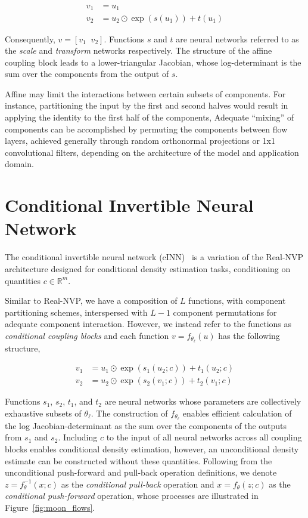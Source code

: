 \begin{align}
    v_1 &= u_1 \nonumber \\
    v_2 &= u_2 \odot \exp(s(u_1)) + t(u_1) \nonumber
\end{align}

Consequently, $v = \left[ v_1 \;\; v_2 \right]$.
Functions $s$ and $t$ are neural networks referred to as the \textit{scale} and \textit{transform} networks respectively.
The structure of the affine coupling block leads to a lower-triangular Jacobian, whose log-determinant is the
sum over the components from the output of $s$.

Affine may limit the interactions between certain subsets of components.
For instance, partitioning the input by the first and second halves would result in applying the identity to
the first half of the components,
Adequate ``mixing'' of components can be accomplished by permuting the components between flow layers, achieved
generally through random orthonormal projections or 1x1 convolutional filters, depending on the architecture of the
model and application domain.

\section{Conditional Invertible Neural Network}\label{sec:conditional-invertible-neural-network}

The conditional invertible neural network (cINN)~\cite{cinn} is a variation of the Real-NVP architecture designed for
conditional density estimation tasks, conditioning on quantities $c \in \mathbb{R}^m$.

Similar to Real-NVP, we have a composition of $L$ functions, with component partitioning schemes, interspersed with $L-1$
component permutations for adequate component interaction.
However, we instead refer to the functions as \textit{conditional coupling blocks} and each function
$v = f_{\theta_\ell}(u)$ has the following structure,

\begin{align}
    v_1 &= u_1 \odot \exp\left( s_1(u_2; c) \right) + t_1(u_2; c) \\
    v_2 &= u_2 \odot \exp\left( s_2(v_1; c) \right) + t_2(v_1; c)
\end{align}

Functions $s_1$, $s_2$, $t_1$, and $t_2$ are neural networks whose parameters are collectively exhaustive subsets of
$\theta_\ell$.
The construction of $f_{\theta_\ell}$ enables efficient calculation of the log Jacobian-determinant as the
sum over the components of the outputs from $s_1$ and $s_2$.
Including $c$ to the input of all neural networks across all coupling blocks enables conditional
density estimation, however, an unconditional density estimate can be constructed without these quantities.
Following from the unconditional push-forward and pull-back operation definitions, we denote $z = f_\theta^{-1}(x; c)$
as the \textit{conditional pull-back} operation and $x = f_\theta(z; c)$ as the \textit{conditional push-forward}
operation, whose processes are illustrated in Figure~\ref{fig:moon_flows}.

